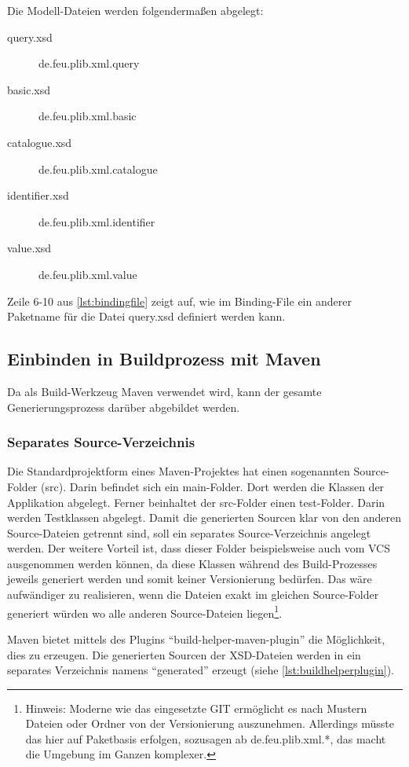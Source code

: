 Die Modell-Dateien werden folgendermaßen abgelegt:

\begin{description}
\item[query.xsd] de.feu.plib.xml.query
\item[basic.xsd] de.feu.plib.xml.basic
\item[catalogue.xsd] de.feu.plib.xml.catalogue
\item[identifier.xsd] de.feu.plib.xml.identifier
\item[value.xsd] de.feu.plib.xml.value
\end{description}

Zeile 6-10 aus \autoref{lst:bindingfile} zeigt auf, wie im Binding-File ein anderer Paketname für die Datei query.xsd definiert werden kann. 

\subsection{Einbinden in Buildprozess mit Maven}
Da als Build-Werkzeug \gls{Maven} verwendet wird, kann der gesamte Generierungsprozess darüber abgebildet werden. 

\subsubsection{Separates Source-Verzeichnis}
Die Standardprojektform eines \gls{Maven}-Projektes hat einen sogenannten Source-Folder (src). Darin befindet sich ein main-Folder. Dort werden die Klassen der Applikation abgelegt. Ferner beinhaltet der src-Folder einen test-Folder. Darin werden Testklassen abgelegt. 
Damit die generierten Sourcen klar von den anderen Source-Dateien getrennt sind, soll ein separates Source-Verzeichnis angelegt werden. Der weitere Vorteil ist, dass dieser Folder beispielsweise auch vom \gls{VCS} ausgenommen werden können, da diese Klassen während des Build-Prozesses jeweils generiert werden und somit keiner Versionierung bedürfen. Das wäre aufwändiger zu realisieren, wenn die Dateien exakt im gleichen Source-Folder generiert würden wo alle anderen Source-Dateien liegen\footnote{Hinweis: Moderne  wie das eingesetzte GIT ermöglicht es nach Mustern Dateien oder Ordner von der Versionierung auszunehmen. Allerdings müsste das hier auf Paketbasis erfolgen, sozusagen ab de.feu.plib.xml.*, das macht die Umgebung im Ganzen komplexer.}. 

\gls{Maven} bietet mittels des Plugins \enquote{build-helper-maven-plugin} die Möglichkeit, dies zu erzeugen. 
Die generierten Sourcen der XSD-Dateien werden in ein separates Verzeichnis namens \enquote{generated} erzeugt (siehe \autoref{lst:buildhelperplugin}). 

